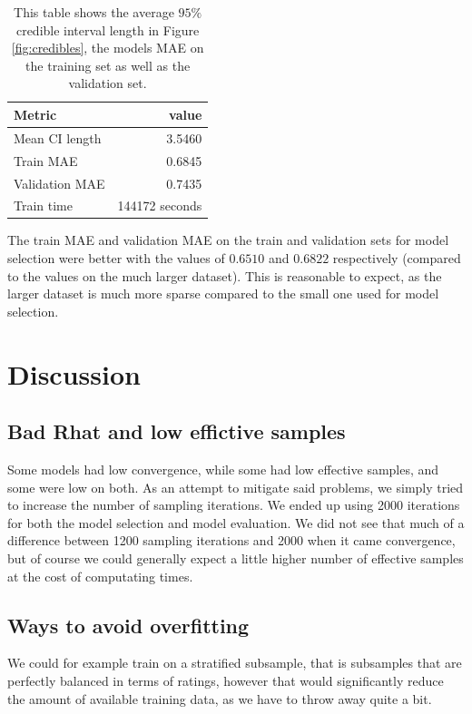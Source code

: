 \documentclass[12pt]{article}
\begin{document}
\begin{table}[H]
    \centering
    \caption{This table shows the average $95\%$ credible interval length in Figure \ref{fig:credibles}, the models MAE on the training set as well as the validation set.}
    \begin{tabular}{l|r}
        \toprule
        Metric & value \\
        \midrule
        Mean CI length & 3.5460 \\
        Train MAE & 0.6845 \\
        Validation MAE & 0.7435 \\
        Train time & 144172 seconds\\
        \bottomrule
    \end{tabular}
\end{table}
The train MAE and validation MAE on the train and validation sets for model selection were better with the values of $0.6510$ and $0.6822$ respectively (compared to the values on the much larger dataset). This is reasonable to expect, as the larger dataset is much more sparse compared to the small one used for model selection.

\section{Discussion}
    \subsection*{Bad Rhat and low effictive samples}
    Some models had low convergence, while some had low effective samples, and some were low on both. As an attempt to mitigate said problems, we simply tried to increase the number of sampling iterations. We ended up using 2000 iterations for both the model selection and model evaluation. We did not see that much of a difference between 1200 sampling iterations and 2000 when it came convergence, but of course we could generally expect a little higher number of effective samples at the cost of computating times.

    \subsection*{Ways to avoid overfitting}
    We could for example train on a stratified subsample, that is subsamples that are perfectly balanced in terms of ratings, however that would significantly reduce the amount of available training data, as we have to throw away quite a bit.
\end{document}
